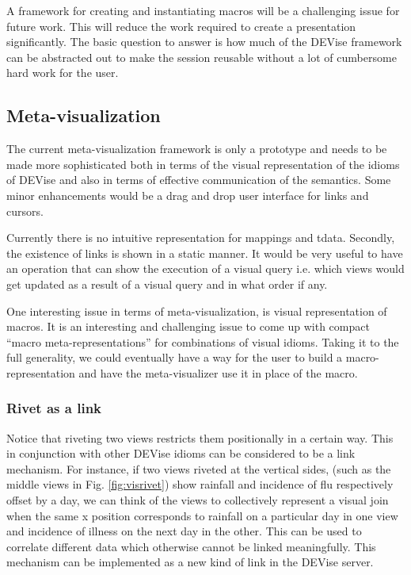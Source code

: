 A framework for creating and instantiating macros will be a challenging
issue for future work. This will reduce the work required to create a 
presentation significantly. The basic question to answer is how much of the
DEVise framework can be abstracted out to make the session reusable without
a lot of cumbersome hard work for the user.

\subsection{Meta-visualization}

The current meta-visualization framework is only a prototype and needs
to be made more sophisticated both in terms of the visual representation
of the idioms of DEVise and also in terms of effective communication of the
semantics. Some minor enhancements would be a drag and drop user interface
for links and cursors. 

Currently there is no intuitive representation for mappings and tdata. 
Secondly, the existence of links is shown in a static manner. It would
be very useful to have an operation that can show the execution of a 
visual query i.e. which views would get updated as a result of a visual
query and in what order if any. 

One interesting issue in terms of meta-visualization, is 
visual representation of macros. It is an interesting and challenging
issue to come up with compact ``macro meta-representations'' for
combinations of visual idioms. Taking it to the full generality, we
could eventually have a way for the user to build a macro-representation
and have the meta-visualizer use it in place of the macro.

\subsubsection{Rivet as a link} 

Notice that riveting two views restricts them positionally in a certain
way. This in conjunction with other DEVise idioms can be considered to be 
a link mechanism. For instance, if two views riveted at the vertical sides, 
(such as the middle views in Fig. \ref{fig:visrivet}) show rainfall and
incidence of flu respectively offset by a day, we can think of the views to 
collectively represent a visual join when the same x position corresponds to
rainfall on a particular day in one view and incidence of illness on the next
day in the other. This can be used to correlate different data which otherwise
cannot be linked meaningfully. This mechanism can be implemented as
a new kind of link in the DEVise server.

